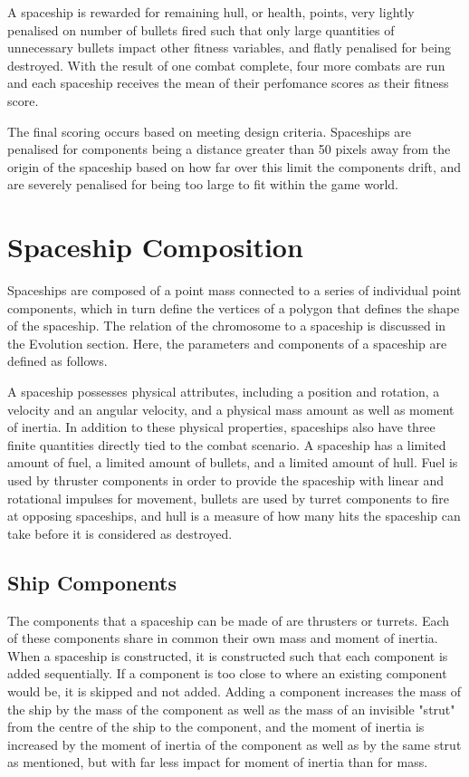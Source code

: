 \documentclass[a4paper]{article}
\begin{document}
A spaceship is rewarded for remaining hull, or health, points, very lightly penalised on number of bullets fired such that only large quantities of unnecessary bullets impact other fitness variables, and flatly penalised for being destroyed. With the result of one combat complete, four more combats are run and each spaceship receives the mean of their perfomance scores as their fitness score.

The final scoring occurs based on meeting design criteria. Spaceships are penalised for components being a distance greater than 50 pixels away from the origin of the spaceship based on how far over this limit the components drift, and are severely penalised for being too large to fit within the game world.

\section{Spaceship Composition}

Spaceships are composed of a point mass connected to a series of individual point components, which in turn define the vertices of a polygon that defines the shape of the spaceship. The relation of the chromosome to a spaceship is discussed in the Evolution section. Here, the parameters and components of a spaceship are defined as follows.

A spaceship possesses physical attributes, including a position and rotation, a velocity and an angular velocity, and a physical mass amount as well as moment of inertia. In addition to these physical properties, spaceships also have three finite quantities directly tied to the combat scenario. A spaceship has a limited amount of fuel, a limited amount of bullets, and a limited amount of hull. Fuel is used by thruster components in order to provide the spaceship with linear and rotational impulses for movement, bullets are used by turret components to fire at opposing spaceships, and hull is a measure of how many hits the spaceship can take before it is considered as destroyed.

\subsection{Ship Components}

The components that a spaceship can be made of are thrusters or turrets. Each of these components share in common their own mass and moment of inertia. When a spaceship is constructed, it is constructed such that each component is added sequentially. If a component is too close to where an existing component would be, it is skipped and not added. Adding a component increases the mass of the ship by the mass of the component as well as the mass of an invisible "strut" from the centre of the ship to the component, and the moment of inertia is increased by the moment of inertia of the component as well as by the same strut as mentioned, but with far less impact for moment of inertia than for mass.
\end{document}
